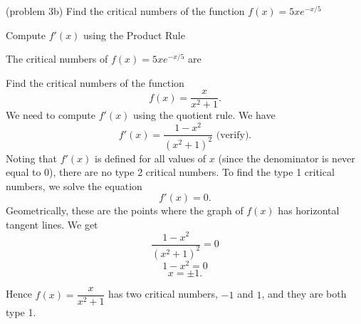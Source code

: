 \documentclass[handout]{ximera}
\begin{document}
\begin{problem}(problem 3b)
  Find the critical numbers of the function $f(x) = 5xe^{-x/5}$
  
  
    \begin{hint}
      Compute $f'(x)$ using the Product Rule
    \end{hint}
 
		The critical numbers of $f(x) = 5xe^{-x/5}$ are
		 \begin{multipleChoice}
		\end{multipleChoice} 
		
\end{problem}




\begin{example}[example 4] Find the critical numbers of the function 
\[f(x) = \dfrac{x}{x^2 +1}.\]
We need to compute $f'(x)$ using the quotient rule.  We have
\[f'(x) = \frac{1-x^2}{(x^2+1)^2} \mbox{   (verify)}.\]
Noting that $f'(x)$ is defined for all values of $x$ (since the denominator is never equal to 0), 
there are no type 2 critical numbers.
To find the type 1 critical numbers, we solve the equation
\[f'(x) = 0.\]
Geometrically, these are the points where the graph of $f(x)$ has horizontal tangent lines.
We get
\[ \frac{1-x^2}{(x^2+1)^2} =0\]
\[ 1-x^2 =0\]
\[x = \pm 1.\]

Hence $f(x) = \dfrac{x}{x^2 +1}$ has two critical numbers, $-1$ and $1$, and they are both type 1. 

\begin{image}
\end{image}

\end{example}
\end{document}
